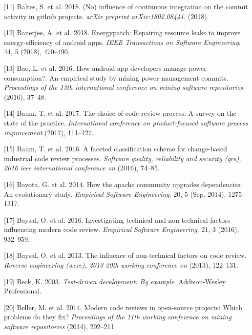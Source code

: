 \documentclass[]{book}
\begin{document}
\hypertarget{ref-baltes2018no}{}
{[}11{]} Baltes, S. et al. 2018. (No) influence of continuous
integration on the commit activity in github projects. \emph{arXiv
preprint arXiv:1802.08441}. (2018).

\hypertarget{ref-BCBR2017}{}
{[}12{]} Banerjee, A. et al. 2018. Energypatch: Repairing resource leaks
to improve energy-efficiency of android apps. \emph{IEEE Transactions on
Software Engineering}. 44, 5 (2018), 470--490.

\hypertarget{ref-BLXWT2016}{}
{[}13{]} Bao, L. et al. 2016. How android app developers manage power
consumption?: An empirical study by mining power management commits.
\emph{Proceedings of the 13th international conference on mining
software repositories} (2016), 37--48.

\hypertarget{ref-baum2017choice}{}
{[}14{]} Baum, T. et al. 2017. The choice of code review process: A
survey on the state of the practice. \emph{International conference on
product-focused software process improvement} (2017), 111--127.

\hypertarget{ref-baum2016faceted}{}
{[}15{]} Baum, T. et al. 2016. A faceted classification scheme for
change-based industrial code review processes. \emph{Software quality,
reliability and security (qrs), 2016 ieee international conference on}
(2016), 74--85.

\hypertarget{ref-Bavota2014}{}
{[}16{]} Bavota, G. et al. 2014. How the apache community upgrades
dependencies: An evolutionary study. \emph{Empirical Software
Engineering}. 20, 5 (Sep. 2014), 1275--1317.

\hypertarget{ref-baysal2016investigating}{}
{[}17{]} Baysal, O. et al. 2016. Investigating technical and
non-technical factors influencing modern code review. \emph{Empirical
Software Engineering}. 21, 3 (2016), 932--959.

\hypertarget{ref-baysal2013influence}{}
{[}18{]} Baysal, O. et al. 2013. The influence of non-technical factors
on code review. \emph{Reverse engineering (wcre), 2013 20th working
conference on} (2013), 122--131.

\hypertarget{ref-beck2003test}{}
{[}19{]} Beck, K. 2003. \emph{Test-driven development: By example}.
Addison-Wesley Professional.

\hypertarget{ref-beller2014modern}{}
{[}20{]} Beller, M. et al. 2014. Modern code reviews in open-source
projects: Which problems do they fix? \emph{Proceedings of the 11th
working conference on mining software repositories} (2014), 202--211.
\end{document}
